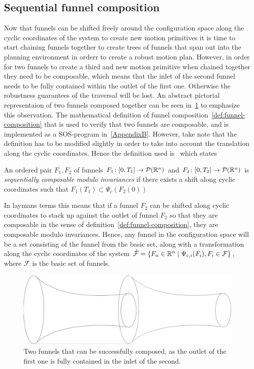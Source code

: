 \subsection{Sequential funnel composition}
\label{sec:composable-funnels}

Now that funnels can be shifted freely around the configuration space along the
cyclic coordinates of the system to create new motion primitives it is time to
start chaining funnels together to create trees of funnels that span out into
the planning environment in orderr to create a robust motion plan. However, in
order for two funnels to create a third and new motion primitive when chained
together they need to be composable, which means that the inlet of the second
funnel needs to be fully contained within the outlet of the first one. Otherwise
the robustness guarantees of the traversal will be lost. An abstract pictorial
representaion of two funnels composed together can be seen
in~\ref{fig:two-funnels-composed} to emphasize this observation. The
mathematical definition of funnel composition~\ref{def:funnel-composition}
that is used to verify that two funnels are composable, and is implemented as a
\ac{SOS}-program in~\ref{AppendixB}. However, take note that the definition
has to be modified slightly in order to take into account the translation along
the cyclic coordinates. Hence the definition used
is~\cite[definition~3,sec~5]{majumdarFunnelLibrariesRealtime2017} which states
\begin{definition}
  An ordered pair \(F_1,F_2\) of funnels \(F_1 \colon [0,T_1] \rightarrow
  \mathcal{P}(\mathbb{R}^n)\) and \(F_2 \colon [0,T_2] \rightarrow \mathcal{P}(\mathbb{R}^n)\)
  is \textit{sequentially composable modulo invariances} if there exists a shift
  along cyclic coordinates such that \(F_{1}(T_1) \subset
  \Psi_{c}\left(F_2(0)\right)\)
\end{definition}
In laymans terms this means that if a funnel \(F_2\) can be shifted along cyclic
coordinates to stack up against the outlet of funnel \(F_2\) so that they are
composable in the sense of definition~\ref{def:funnel-composition}, they are
composable modulo invariances. Hence, any funnel in the configuration space will
be a set consisting of the funnel from the basic set, along with a
transformation along the cyclic coordinates of the system \(\hat{\mathcal{F}} =
\lbrace F_n \in \mathbb{R}^n \mid \Psi_{c,i}(F_i), F_i \in \mathcal{F}\rbrace\), where
\(\mathcal{F}\) is the basic set of funnels.

\begin{figure}
  \includegraphics[scale=.2]{figures/method/funnel-composition} \centering
  \caption{Two funnels that can be successfully composed, as the outlet of the
    first one is fully contained in the inlet of the second.}
  \label{fig:two-funnels-composed}
\end{figure}

